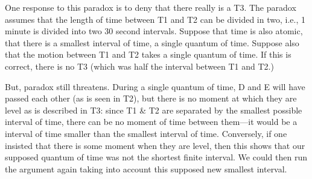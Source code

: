 \documentclass[oneside]{article}
\begin{document}
One response to this paradox is to deny that there really is a T3. The paradox assumes that the length of time between T1 and T2 can be divided in two, i.e., 1 minute is divided into two 30
second intervals. Suppose that time is also atomic, that there is a
smallest interval of time, a single quantum of time. Suppose also that
the motion between T1 and T2 takes a single quantum of time. If this is
correct, there is no T3 (which was half the interval between T1 and T2.) 

But, paradox still threatens. During a single quantum of time, D and E will
have passed each other (as is seen in T2), but there is no moment at
which they are level as is described in T3: since T1 \& T2 are
separated by the smallest possible interval of time, there can be no moment of time between them---it would be a interval of time smaller than the smallest interval of time. Conversely, if one insisted that there is some moment when they are level, then this shows that our supposed quantum of time was not the shortest finite interval. We could then run the argument again taking into account this supposed new smallest interval.
\end{document}
